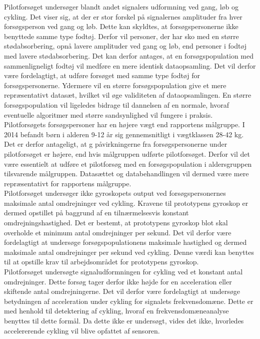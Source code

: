 Pilotforsøget undersøger blandt andet signalers udformning ved gang, løb og cykling. Det viser sig, at der er stor forskel på signalernes amplituder fra hver forsøgsperson ved gang og løb. Dette kan skyldtes, at forsøgspersonerne ikke benyttede samme type fodtøj. Derfor vil personer, der har sko med en større stødabsorbering, opnå lavere amplituder ved gang og løb, end personer i fodtøj med lavere stødabsorbering. Det kan derfor antages, at en forsøgspopulation med sammenligneligt fodtøj vil medføre en mere identisk dataopsamling. Det vil derfor være fordelagtigt, at udføre forsøget med samme type fodtøj for forsøgspersonerne. Ydermere vil en større forsøgspopulation give et mere repræsentativt datasæt, hvilket vil øge validiteten af dataopsamlingen. En større forsøgspopulation vil ligeledes bidrage til dannelsen af en normale, hvoraf eventuelle algoritmer med større sandsynlighed vil fungere i praksis.\\
Pilotforsøgets forsøgspersoner har en højere vægt end rapportens målgruppe. I 2014 befandt børn i alderen 9-12 år sig gennemsnitligt i vægtklassen 28-42 kg. \citep{Rigsholspitalet2014} Det er derfor antageligt, at g påvirkningerne fra forsøgspersonerne under pilotforsøget er højere, end hvis målgruppen udførte pilotforsøget. Derfor vil det være essentielt at udføre et pilotforsøg med en forsøgspopulation i aldersgruppen tilsvarende målgruppen. Datasættet og databehandlingen vil dermed være mere repræsentativt for rapportens målgruppe.\\
Pilotforsøget undersøger ikke gyroskopets output ved forsøgspersonernes maksimale antal omdrejninger ved cykling. Kravene til prototypens gyroskop er dermed opstillet på baggrund af en tilnærmelsesvis konstant omdrejningshastighed. Det er bestemt, at prototypens gyroskop blot skal overholde et minimum antal omdrejninger per sekund. Det vil derfor være fordelagtigt at undersøge forsøgspopulationens maksimale hastighed og dermed maksimale antal omdrejninger per sekund ved cykling. Denne værdi kan benyttes til at opstille krav til arbejdsområdet for prototypens gyroskop.\\

Pilotforsøget undersøgte signaludformningen for cykling ved et konstant antal omdrejninger. Dette forsøg tager derfor ikke højde for en acceleration eller skiftende antal omdrejningerne. Det vil derfor være fordelagtigt at undersøge betydningen af acceleration under cykling for signalets frekvensdomæne. Dette er med henhold til detektering af cykling, hvoraf en frekvensdomæneanalyse benyttes til dette formål. Da dette ikke er undersøgt, vides det ikke, hvorledes accelererende cykling vil blive opfattet af sensoren.

